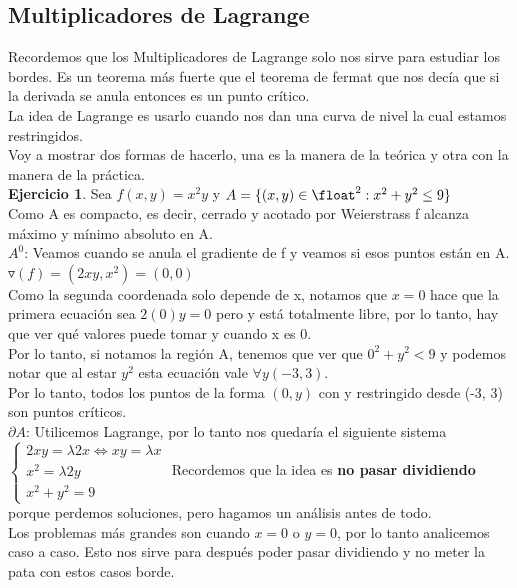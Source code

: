 \documentclass[10pt,a4paper]{article}
\begin{document}
\subsection*{Multiplicadores de Lagrange}
\label{subsec:multiplicadores_lagrange}
Recordemos que los Multiplicadores de Lagrange solo nos sirve para estudiar los bordes. Es un teorema más fuerte que el teorema de fermat que nos decía que si la derivada se anula entonces es un punto crítico. \\
La idea de Lagrange es usarlo cuando nos dan una curva de nivel la cual estamos restringidos. \\
Voy a mostrar dos formas de hacerlo, una es la manera de la teórica y otra con la manera de la práctica. \\
\textbf{Ejercicio 1}. Sea $f(x,y) = x^{2}y$ y $A = \{(x,y) \in \float^{2} : x^{2}+y^{2} \le 9\}$ \\
Como A es compacto, es decir, cerrado y acotado por Weierstrass f alcanza máximo y mínimo absoluto en A. \\
$A^{0}$: Veamos cuando se anula el gradiente de f y veamos si esos puntos están en A. \\
$\triangledown(f) = (2xy, x^{2}) = (0, 0)$ \\
Como la segunda coordenada solo depende de x, notamos que $x=0$ hace que la primera ecuación sea $2(0) y = 0$ pero y está totalmente libre, por lo tanto, hay que ver qué valores puede tomar y cuando x es 0. \\
Por lo tanto, si notamos la región A, tenemos que ver que $0^{2} + y^{2} < 9$ y podemos notar que al estar $y^{2}$ esta ecuación vale $\forall y (-3, 3)$. \\
Por lo tanto, todos los puntos de la forma $(0, y)$ con y restringido desde (-3, 3) son puntos críticos. \\
$\partial A$: Utilicemos Lagrange, por lo tanto nos quedaría el siguiente sistema \\
$\begin{cases}
   2xy = \lambda 2x \iff xy = \lambda x \\ 
   x^{2} = \lambda 2y \\
   x^{2} + y^{2} = 9
\end{cases}$ 
Recordemos que la idea es \textbf{no pasar dividiendo} porque perdemos soluciones, pero hagamos un análisis antes de todo. \\
Los problemas más grandes son cuando $x = 0$ o $y = 0$, por lo tanto analicemos caso a caso. Esto nos sirve para después poder pasar dividiendo y no meter la pata con estos casos borde. \\
\end{document}
